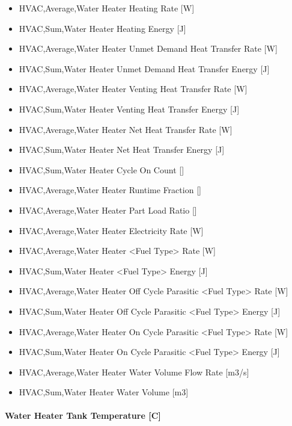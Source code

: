 \begin{itemize}
\item
  HVAC,Average,Water Heater Heating Rate {[}W{]}
\item
  HVAC,Sum,Water Heater Heating Energy {[}J{]}
\item
  HVAC,Average,Water Heater Unmet Demand Heat Transfer Rate {[}W{]}
\item
  HVAC,Sum,Water Heater Unmet Demand Heat Transfer Energy {[}J{]}
\item
  HVAC,Average,Water Heater Venting Heat Transfer Rate {[}W{]}
\item
  HVAC,Sum,Water Heater Venting Heat Transfer Energy {[}J{]}
\item
  HVAC,Average,Water Heater Net Heat Transfer Rate {[}W{]}
\item
  HVAC,Sum,Water Heater Net Heat Transfer Energy {[}J{]}
\item
  HVAC,Sum,Water Heater Cycle On Count {[]}
\item
  HVAC,Average,Water Heater Runtime Fraction {[]}
\item
  HVAC,Average,Water Heater Part Load Ratio {[]}
\item
  HVAC,Average,Water Heater Electricity Rate {[}W{]}
\item
  HVAC,Average,Water Heater \textless{}Fuel Type\textgreater{} Rate {[}W{]}
\item
  HVAC,Sum,Water Heater \textless{}Fuel Type\textgreater{} Energy {[}J{]}
\item
  HVAC,Average,Water Heater Off Cycle Parasitic \textless{}Fuel Type\textgreater{} Rate {[}W{]}
\item
  HVAC,Sum,Water Heater Off Cycle Parasitic \textless{}Fuel Type\textgreater{} Energy {[}J{]}
\item
  HVAC,Average,Water Heater On Cycle Parasitic \textless{}Fuel Type\textgreater{} Rate {[}W{]}
\item
  HVAC,Sum,Water Heater On Cycle Parasitic \textless{}Fuel Type\textgreater{} Energy {[}J{]}
\item
  HVAC,Average,Water Heater Water Volume Flow Rate {[}m3/s{]}
\item
  HVAC,Sum,Water Heater Water Volume {[}m3{]}
\end{itemize}

\paragraph{Water Heater Tank Temperature {[}C{]}}\label{water-heater-tank-temperature-c}

